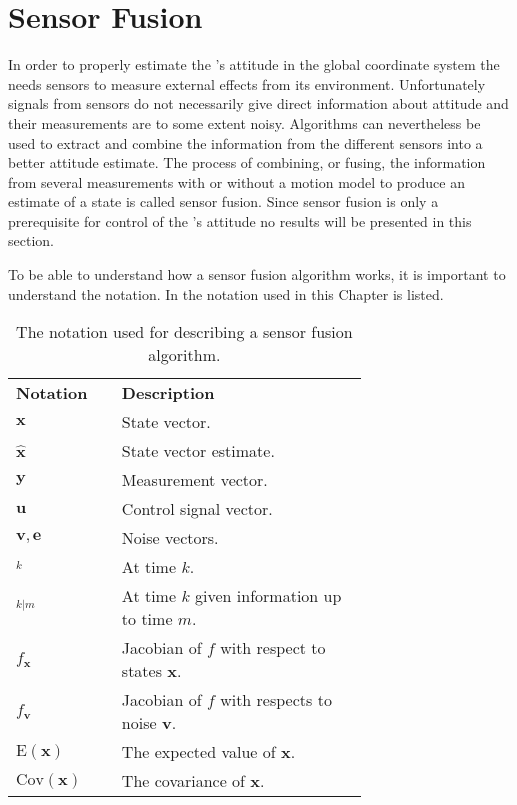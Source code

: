 \chapter{Sensor Fusion}\label{cha:sensor_fusion}
In order to properly estimate the \abbrROV's attitude in the global coordinate system the \abbrROV needs sensors to measure external effects from its environment.
Unfortunately signals from sensors do not necessarily give direct information about attitude and their measurements are to some extent noisy. Algorithms can nevertheless be used to extract and combine the information from the different sensors into a better attitude estimate. The process of combining, or fusing, the information from several measurements with or without a motion model to produce an estimate of a state is called sensor fusion. Since sensor fusion is only a prerequisite for control of the \abbrROV's attitude no results will be presented in this section. 

To be able to understand how a sensor fusion algorithm works, it is important to understand the notation. In   the notation used in this Chapter is listed.
 \begin{table}[htbp]
  \centering
  \caption{\label{tab:notationKalman}%
    The notation used for describing a sensor fusion algorithm.}
    \begin{tabular}{l p{0.7\linewidth}}
    \toprule%
    \textbf{Notation} & \textbf{Description} \\
    \otoprule%
    $\boldsymbol{x}$ & State vector.\\
    $\hat{\boldsymbol{x}}$ & State vector estimate.\\
    $\boldsymbol{y}$ & Measurement vector.\\
    $\boldsymbol{u}$ & Control signal vector.\\
    $\boldsymbol{v},\boldsymbol{e}$ & Noise vectors.\\
    $_k$ & At time $k$.\\
    $_{k|m}$ & At time $k$ given information up to time $m$.\\
    $f_{\boldsymbol{x}}$ & Jacobian of $f$ with respect to states $\boldsymbol{x}$.\\
    $f_{\boldsymbol{v}}$ & Jacobian of $f$ with respects to noise $\boldsymbol{v}$.\\
    $\text{E}(\boldsymbol{x})$ & The expected value of $\boldsymbol{x}$.\\
    $\text{Cov}(\boldsymbol{x})$ & The covariance of $\boldsymbol{x}$.\\
    \bottomrule%
 \end{tabular}
\end{table}


